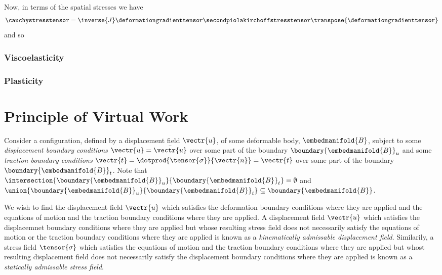 Now, in terms of the spatial stresses we have
\begin{equation}
  \cauchystresstensor=\inverse{J}\deformationgradienttensor\secondpiolakirchoffstresstensor\transpose{\deformationgradienttensor}
\end{equation}
and so


\subsubsection{Viscoelasticity}

\subsubsection{Plasticity}

\section{Principle of Virtual Work}
\label{sec:ElasticityVirtualWork}

Consider a configuration, defined by a displacement field $\vectr{u}$, of some
deformable body, $\embedmanifold{B}$, subject to some \emph{displacement
  boundary conditions} $\vectr{u}=\bar{\vectr{u}}$ over some part of the
boundary $\boundary{\embedmanifold{B}}_{u}$ and some \emph{traction boundary
  conditions} $\vectr{t}=\dotprod{\tensor{\sigma}}{\vectr{n}}=\bar{\vectr{t}}$
over some part of the boundary $\boundary{\embedmanifold{B}}_{t}$. Note that
$\intersection{\boundary{\embedmanifold{B}}_{u}}{\boundary{\embedmanifold{B}}_{t}}=\emptyset$
and
$\union{\boundary{\embedmanifold{B}}_{u}}{\boundary{\embedmanifold{B}}_{t}}\subseteq\boundary{\embedmanifold{B}}$.

We wish to find the displacement field $\vectr{u}$ which satisfies the
deformation boundary conditions where they are applied and the equations of
motion and the traction boundary conditions where they are applied. A
displacement field $\vectr{u}$ which satisfies the displacemnet boundary
conditions where they are applied but whose resulting stress field does not
necessarily satisfy the equations of motion or the traction boundary
conditions where they are applied is known as a \emph{kinematically admissable
  displacement field}. Similarily, a stress field $\tensor{\sigma}$ which
satisfies the equations of motion and the traction boundary conditions where
they are applied but whost resulting displacement field does not necessarily
satisfy the displacement boundary conditions where they are applied is known
as a \emph{statically admissable stress field}.

